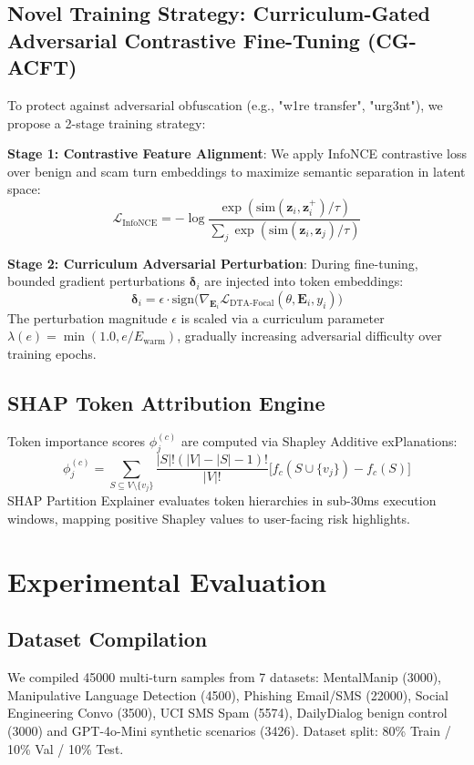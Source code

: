 \documentclass[10pt,conference]{IEEEtran}
\begin{document}
\subsection{Novel Training Strategy: Curriculum-Gated Adversarial Contrastive Fine-Tuning (CG-ACFT)}
To protect against adversarial obfuscation (e.g., "w1re transfer", "urg3nt"), we propose a 2-stage training strategy:

\textbf{Stage 1: Contrastive Feature Alignment}: We apply InfoNCE contrastive loss over benign and scam turn embeddings to maximize semantic separation in latent space:
\begin{equation}
\mathcal{L}_{\text{InfoNCE}} = -\log \frac{\exp(\text{sim}(\mathbf{z}_i, \mathbf{z}_i^+) / \tau)}{\sum_{j} \exp(\text{sim}(\mathbf{z}_i, \mathbf{z}_j) / \tau)}
\end{equation}

\textbf{Stage 2: Curriculum Adversarial Perturbation}: During fine-tuning, bounded gradient perturbations $\mathbf{\delta}_i$ are injected into token embeddings:
\begin{equation}
\mathbf{\delta}_i = \epsilon \cdot \text{sign}\big( \nabla_{\mathbf{E}_i} \mathcal{L}_{\text{DTA-Focal}}(\theta, \mathbf{E}_i, y_i) \big)
\end{equation}
The perturbation magnitude $\epsilon$ is scaled via a curriculum parameter $\lambda(e) = \min(1.0, e / E_{\text{warm}})$, gradually increasing adversarial difficulty over training epochs.

\subsection{SHAP Token Attribution Engine}
Token importance scores $\phi_j^{(c)}$ are computed via Shapley Additive exPlanations:
\begin{equation}
\phi_j^{(c)} = \sum_{S \subseteq V \setminus \{v_j\}} \frac{|S|!(|V| - |S| - 1)!}{|V|!} \Big[ f_c(S \cup \{v_j\}) - f_c(S) \Big]
\end{equation}
SHAP Partition Explainer evaluates token hierarchies in sub-30ms execution windows, mapping positive Shapley values to user-facing risk highlights.

\section{Experimental Evaluation}

\subsection{Dataset Compilation}
We compiled 45000 multi-turn samples from 7 datasets: MentalManip (3000), Manipulative Language Detection (4500), Phishing Email/SMS (22000), Social Engineering Convo (3500), UCI SMS Spam (5574), DailyDialog benign control (3000) and GPT-4o-Mini synthetic scenarios (3426). Dataset split: 80\% Train / 10\% Val / 10\% Test.
\end{document}
